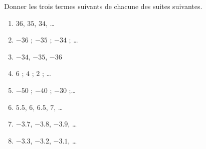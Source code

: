 
\begin{exercice}\label{exo2smath-0054}

    Donner les trois termes suivants de chacune des suites suivantes.
    \begin{enumerate}
        \item
            \( 36\), \( 35\), \( 34\), \ldots
        \item
            $-36$ ; $-35$ ; $-34$ ; \ldots
        \item
            \( -34\), \( -35\), \( -36\)
\item
 $6$ ; $4$ ; $2$ ; \ldots
\item
 $-50$ ; $-40$ ; $-30$ ;\ldots
            \item
                \( 5.5\), \( 6\), \( 6.5\), \( 7\), \ldots
            \item
                \( -3.7\), \( -3.8\), \( -3.9\), \ldots
            \item
                \( -3.3\), \( -3.2\),  \( -3.1\), \ldots
    \end{enumerate}

\end{exercice}
